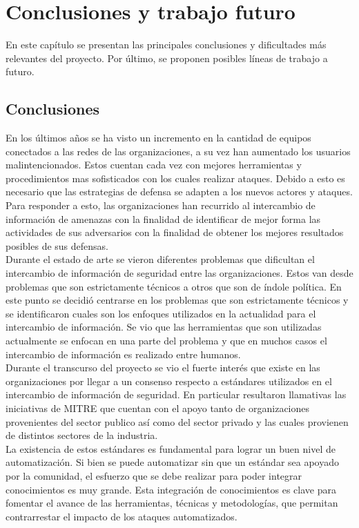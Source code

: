 \chapter{Conclusiones y trabajo futuro}
\label{capitulo7}

En este capítulo se presentan las principales conclusiones y dificultades más relevantes del proyecto. Por último, se proponen posibles líneas de trabajo a futuro.

\section{Conclusiones}

En los últimos años se ha visto un incremento en la cantidad de equipos conectados a las redes de las organizaciones, a su vez han aumentado los usuarios malintencionados. Estos cuentan cada vez con mejores herramientas y procedimientos mas sofisticados con los cuales realizar ataques. Debido a esto es necesario que las estrategias de defensa se adapten a los nuevos actores y ataques. Para responder a esto, las organizaciones han recurrido al intercambio de información de amenazas con la finalidad de identificar de mejor forma las actividades de sus adversarios con la finalidad de obtener los mejores resultados posibles de sus defensas.\\
\bigskip
Durante el estado de arte se vieron diferentes problemas que dificultan el intercambio de información de seguridad entre las organizaciones. Estos van desde problemas que son estrictamente técnicos a otros que son de índole política. En este punto se decidió centrarse en los problemas que son estrictamente técnicos y se identificaron cuales son los enfoques utilizados en la actualidad para el intercambio de información. Se vio que las  herramientas que son utilizadas actualmente se enfocan en una parte del problema y que en muchos casos el intercambio de información es realizado entre humanos.  \\
\bigskip
Durante el transcurso del proyecto se vio el fuerte interés que existe en las organizaciones por llegar a un consenso respecto a estándares utilizados en el intercambio de información de seguridad.  En particular resultaron llamativas las iniciativas de MITRE que cuentan con el apoyo tanto de organizaciones provenientes del sector publico así como del sector privado y las cuales provienen de distintos sectores de la industria.\\   
\bigskip
La existencia de estos estándares es fundamental para lograr un buen nivel de automatización. Si bien se puede automatizar sin que un estándar sea apoyado por la comunidad, el esfuerzo que se debe realizar para poder integrar conocimientos es muy grande. Esta integración de conocimientos es clave para fomentar el avance de las herramientas, técnicas y metodologías, que permitan contrarrestar el impacto de los ataques automatizados.\\
